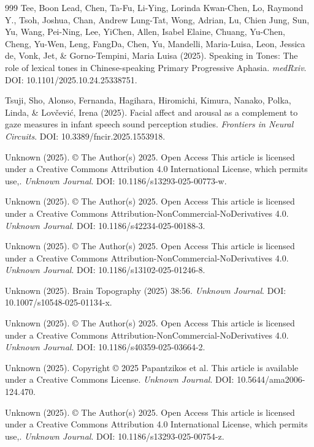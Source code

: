 \documentclass[9pt,onecolumn]{article}
\begin{document}
\begin{thebibliography}{999}
Tee, Boon Lead, Chen, Ta-Fu, Li-Ying, Lorinda Kwan-Chen, Lo, Raymond Y., Tsoh, Joshua, Chan, Andrew Lung-Tat, Wong, Adrian, Lu, Chien Jung, Sun, Yu, Wang, Pei-Ning, Lee, YiChen, Allen, Isabel Elaine, Chuang, Yu-Chen, Cheng, Yu-Wen, Leng, FangDa, Chen, Yu, Mandelli, Maria-Luisa, Leon, Jessica de, Vonk, Jet, \& Gorno-Tempini, Maria Luisa (2025). Speaking in Tones: The role of lexical tones in Chinese-speaking Primary Progressive Aphasia. \textit{medRxiv}. DOI: 10.1101/2025.10.24.25338751.

Tsuji, Sho, Alonso, Fernanda, Hagihara, Hiromichi, Kimura, Nanako, Polka, Linda, \& Lovčević, Irena (2025). Facial affect and arousal as a complement to gaze measures in infant speech sound perception studies. \textit{Frontiers in Neural Circuits}. DOI: 10.3389/fncir.2025.1553918.

Unknown (2025). © The Author(s) 2025. Open Access This article is licensed under a Creative Commons Attribution 4.0 International License, which permits use,. \textit{Unknown Journal}. DOI: 10.1186/s13293-025-00773-w.

Unknown (2025). © The Author(s) 2025. Open Access This article is licensed under a Creative Commons Attribution-NonCommercial-NoDerivatives 4.0. \textit{Unknown Journal}. DOI: 10.1186/s42234-025-00188-3.

Unknown (2025). © The Author(s) 2025. Open Access This article is licensed under a Creative Commons Attribution-NonCommercial-NoDerivatives 4.0. \textit{Unknown Journal}. DOI: 10.1186/s13102-025-01246-8.

Unknown (2025). Brain Topography (2025) 38:56. \textit{Unknown Journal}. DOI: 10.1007/s10548-025-01134-x.

Unknown (2025). © The Author(s) 2025. Open Access This article is licensed under a Creative Commons Attribution-NonCommercial-NoDerivatives 4.0. \textit{Unknown Journal}. DOI: 10.1186/s40359-025-03664-2.

Unknown (2025). Copyright © 2025 Papantzikos et al. This article is available under a Creative Commons License. \textit{Unknown Journal}. DOI: 10.5644/ama2006-124.470.

Unknown (2025). © The Author(s) 2025. Open Access This article is licensed under a Creative Commons Attribution 4.0 International License, which permits use,. \textit{Unknown Journal}. DOI: 10.1186/s13293-025-00754-z.


\end{thebibliography}
\end{document}
